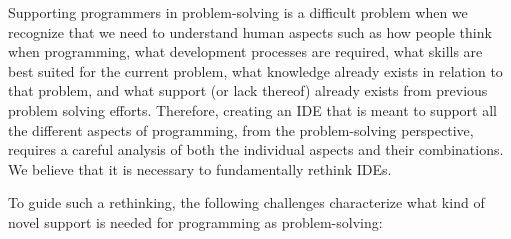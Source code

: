 \documentclass{ppig}
\begin{document}
Supporting programmers in problem-solving is a difficult problem when we recognize that we need to understand human aspects such as how people think when programming, what development processes are required, what skills are best suited for the current problem, what knowledge already exists in relation to that problem, and what support (or lack thereof) already exists from previous problem solving efforts.
Therefore, creating an IDE that is meant to support all the different aspects of programming, from the problem-solving perspective, requires a careful analysis of both the individual aspects and their combinations.
We believe that it is necessary to fundamentally rethink IDEs.

To guide such a rethinking, the following challenges characterize what kind of novel support is needed for programming as problem-solving:
\end{document}
